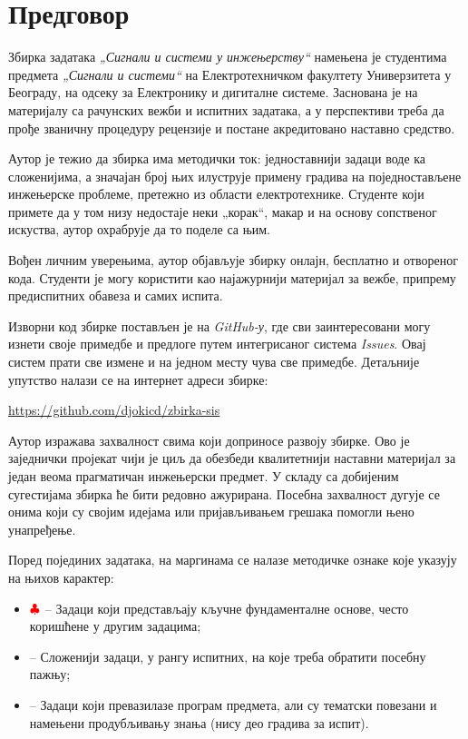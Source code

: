 \section*{Предговор}

Збирка задатака \textit{„Сигнали и системи у инжењерству“} намењена је студентима предмета 
\textit{„Сигнали и системи“} на Електротехничком факултету Универзитета у Београду, 
на одсеку за Електронику и дигиталне системе. Заснована је на материјалу са рачунских вежби 
и испитних задатака, а у перспективи треба да прође званичну процедуру рецензије и 
постане акредитовано наставно средство. 

Аутор је тежио да збирка има методички ток: једноставнији задаци воде ка сложенијима, 
а значајан број њих илуструје примену градива на поједностављене инжењерске проблеме, 
претежно из области електротехнике. Студенте који примете да у том низу недостаје неки 
„корак“, макар и на основу сопственог искуства, аутор охрабрује да то поделе са њим. 

Вођен личним уверењима, аутор објављује збирку онлајн, бесплатно и отвореног кода. 
Студенти је могу користити као најажурнији материјал за вежбе, припрему предиспитних обавеза 
и самих испита. 

Изворни код збирке постављен је на \textit{GitHub-у}, где сви заинтересовани могу изнети 
своје примедбе и предлоге путем интегрисаног система \textit{Issues}. 
Овај систем прати све измене и на једном месту чува све примедбе. 
Детаљније упутство налази се на интернет адреси збирке:
\begin{center}
    \url{https://github.com/djokicd/zbirka-sis}
\end{center}

Аутор изражава захвалност свима који доприносе развоју збирке. Ово је заједнички пројекат 
чији је циљ да обезбеди квалитетнији наставни материјал за један веома прагматичан инжењерски предмет. 
У складу са добијеним сугестијама збирка ће бити редовно ажурирана. 
Посебна захвалност дугује се онима који су својим идејама или пријављивањем грешака помогли њено унапређење. 

Поред појединих задатака, на маргинама се налазе методичке ознаке које указују на њихов карактер:
\begin{itemize}[noitemsep, topsep=0pt]
    \item $\color{red}\clubsuit$ -- Задаци који представљају кључне фундаменталне основе, често коришћене у другим задацима;
    \item \textcolor{red}{\warning} -- Сложенији задаци, у рангу испитних, на које треба обратити посебну пажњу;
    \item \textcolor{red}{\noway} -- Задаци који превазилазе програм предмета, али су тематски повезани и намењени продубљивању знања 
    (нису део градива за испит).
\end{itemize}


